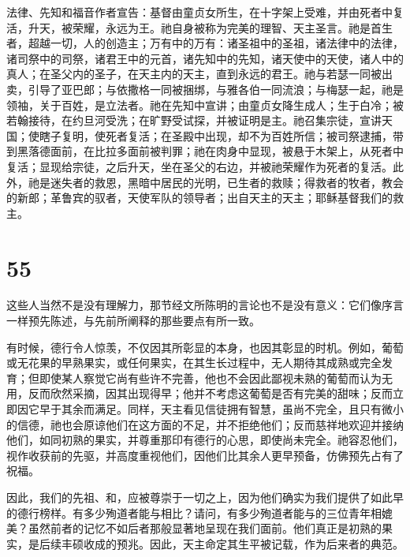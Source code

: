 法律、先知和福音作者宣告：基督由童贞女所生，在十字架上受难，并由死者中复活，升天，被荣耀，永远为王。祂自身被称为完美的理智、天主圣言。祂是首生者，超越一切，人的创造主；万有中的万有：诸圣祖中的圣祖，诸法律中的法律，诸司祭中的司祭，诸君王中的元首，诸先知中的先知，诸天使中的天使，诸人中的真人；在圣父内的圣子，在天主内的天主，直到永远的君王。祂与若瑟一同被出卖，引导了亚巴郎；与依撒格一同被捆绑，与雅各伯一同流浪；与梅瑟一起，祂是领袖，关于百姓，是立法者。祂在先知中宣讲；由童贞女降生成人；生于白冷；被若翰接待，在约旦河受洗；在旷野受试探，并被证明是主。祂召集宗徒，宣讲天国；使瞎子复明，使死者复活；在圣殿中出现，却不为百姓所信；被司祭逮捕，带到黑落德面前，在比拉多面前被判罪；祂在肉身中显现，被悬于木架上，从死者中复活；显现给宗徒，之后升天，坐在圣父的右边，并被祂荣耀作为死者的复活。此外，祂是迷失者的救恩，黑暗中居民的光明，已生者的救赎；得救者的牧者，教会的新郎；革鲁宾的驭者，天使军队的领导者；出自天主的天主；耶稣基督我们的救主。\par


\section{55}

这些人当然不是没有理解力，那节经文所陈明的言论也不是没有意义：它们像序言一样预先陈述，与先前所阐释的那些要点有所一致。\par

有时候，德行令人惊羡，不仅因其所彰显的本身，也因其彰显的时机。例如，葡萄或无花果的早熟果实，或任何果实，在其生长过程中，无人期待其成熟或完全发育；但即使某人察觉它尚有些许不完善，他也不会因此鄙视未熟的葡萄而认为无用，反而欣然采摘，因其出现得早；他并不考虑这葡萄是否有完美的甜味；反而立即因它早于其余而满足。同样，天主看见信徒拥有智慧，虽尚不完全，且只有微小的信德，祂也会原谅他们在这方面的不足，并不拒绝他们；反而慈祥地欢迎并接纳他们，如同初熟的果实，并尊重那印有德行的心思，即使尚未完全。祂容忍他们，视作收获前的先驱，并高度重视他们，因他们比其余人更早预备，仿佛预先占有了祝福。\par

因此，我们的先祖、和，应被尊崇于一切之上，因为他们确实为我们提供了如此早的德行榜样。有多少殉道者能与相比？请问，有多少殉道者能与的三位青年相媲美？虽然前者的记忆不如后者那般显著地呈现在我们面前。他们真正是初熟的果实，是后续丰硕收成的预兆。因此，天主命定其生平被记载，作为后来者的典范。\par

